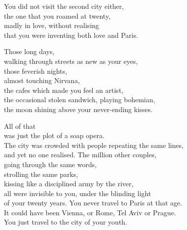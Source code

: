 \documentclass[12pt,twoside]{article}
\newcounter{scounter}
\newcommand\step{\stepcounter{scounter}\Roman{scounter}}
\begin{document}
\poemtitle{\step} 
\begin{poem}
\begin{stanza} 
You did not visit the second city either,\\
the one that you roamed at twenty,\\
madly in love, without realising\\
that you were inventing both love and Paris.
\end{stanza} 
\begin{stanza} 
Those long days,\\
walking through streets as new as your eyes,\\
those feverish nights,\\
almost touching Nirvana,\\
the cafes which made you feel an artist,\\
the occasional stolen sandwich, playing bohemian,\\
the moon shining above your never-ending kisses.
\end{stanza} 
\begin{stanza} 
All of that\\
was just the plot of a soap opera.\\
The city was crowded with people repeating the same lines,\\
and yet no one realised. The million other couples,\\
going through the same words,\\ 
strolling the same parks,\\
kissing like a disciplined army by the river,\\
all were invisible to you, under the blinding light\\
of your twenty years. You never travel to Paris at that age.\\
It could have been Vienna, or Rome, Tel Aviv or Prague.\\
You just travel to the city of your youth. 
\end{stanza}
\end{poem}
\end{document}
